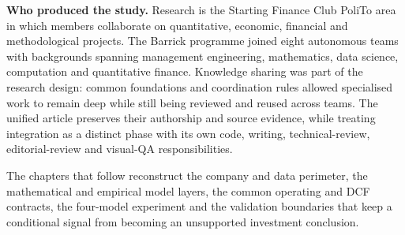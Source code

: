 \noindent\textbf{Who produced the study.} Research is the Starting Finance
Club PoliTo area in which members collaborate on quantitative, economic,
financial and methodological projects. The Barrick programme joined eight
autonomous teams with backgrounds spanning management engineering,
mathematics, data science, computation and quantitative finance. Knowledge
sharing was part of the research design: common foundations and coordination
rules allowed specialised work to remain deep while still being reviewed and
reused across teams. The unified article preserves their authorship and source
evidence, while treating integration as a distinct phase with its own code,
writing, technical-review, editorial-review and visual-QA responsibilities.

The chapters that follow reconstruct the company and data perimeter, the
mathematical and empirical model layers, the common operating and DCF
contracts, the four-model experiment and the validation boundaries that keep a
conditional signal from becoming an unsupported investment conclusion.
